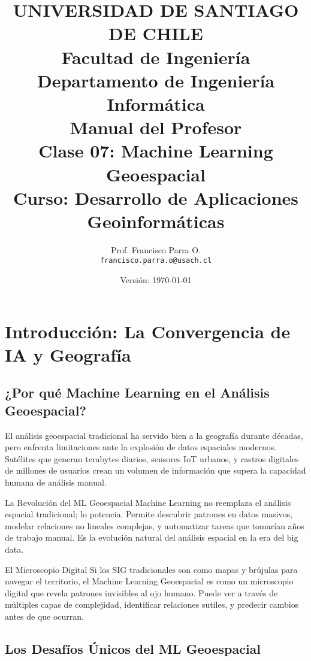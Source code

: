 \documentclass[12pt,a4paper]{article}
\title{
    \vspace{-2cm}
    \Large{UNIVERSIDAD DE SANTIAGO DE CHILE} \\
    \large{Facultad de Ingeniería} \\
    \large{Departamento de Ingeniería Informática} \\
    \vspace{1cm}
    \LARGE{\textbf{Manual del Profesor}} \\
    \Large{\textbf{Clase 07: Machine Learning Geoespacial}} \\
    \vspace{0.5cm}
    \large{Curso: Desarrollo de Aplicaciones Geoinformáticas}
}
\author{
    Prof. Francisco Parra O. \\
    \texttt{francisco.parra.o@usach.cl}
}
\date{Versión: \today}
\begin{document}
\maketitle
\thispagestyle{empty}
\newpage

\tableofcontents
\newpage

\section{Introducción: La Convergencia de IA y Geografía}

\subsection{¿Por qué Machine Learning en el Análisis Geoespacial?}

El análisis geoespacial tradicional ha servido bien a la geografía durante décadas, pero enfrenta limitaciones ante la explosión de datos espaciales modernos. Satélites que generan terabytes diarios, sensores IoT urbanos, y rastros digitales de millones de usuarios crean un volumen de información que supera la capacidad humana de análisis manual.

\begin{conceptbox}{La Revolución del ML Geoespacial}
Machine Learning no reemplaza el análisis espacial tradicional; lo potencia. Permite descubrir patrones en datos masivos, modelar relaciones no lineales complejas, y automatizar tareas que tomarían años de trabajo manual. Es la evolución natural del análisis espacial en la era del big data.
\end{conceptbox}

\begin{analogia}{El Microscopio Digital}
Si los SIG tradicionales son como mapas y brújulas para navegar el territorio, el Machine Learning Geoespacial es como un microscopio digital que revela patrones invisibles al ojo humano. Puede ver a través de múltiples capas de complejidad, identificar relaciones sutiles, y predecir cambios antes de que ocurran.
\end{analogia}

\subsection{Los Desafíos Únicos del ML Geoespacial}
\end{document}
